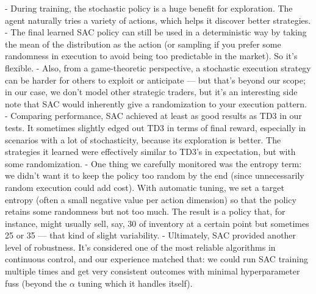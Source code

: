 \documentclass[11pt]{article}
\begin{document}
		- During training, the stochastic policy is a huge benefit for exploration. The agent naturally tries a variety of actions, which helps it discover better strategies.
		- The final learned SAC policy can still be used in a deterministic way by taking the mean of the distribution as the action (or sampling if you prefer some randomness in execution to avoid being too predictable in the market). So it’s flexible.
		- Also, from a game-theoretic perspective, a stochastic execution strategy can be harder for others to exploit or anticipate — but that’s beyond our scope; in our case, we don’t model other strategic traders, but it’s an interesting side note that SAC would inherently give a randomization to your execution pattern.
		- Comparing performance, SAC achieved at least as good results as TD3 in our tests. It sometimes slightly edged out TD3 in terms of final reward, especially in scenarios with a lot of stochasticity, because its exploration is better. The strategies it learned were effectively similar to TD3’s in expectation, but with some randomization.
		- One thing we carefully monitored was the entropy term: we didn’t want it to keep the policy too random by the end (since unnecessarily random execution could add cost). With automatic tuning, we set a target entropy (often a small negative value per action dimension) so that the policy retains some randomness but not too much. The result is a policy that, for instance, might usually sell, say, 30 of inventory at a certain point but sometimes 25 or 35 — that kind of slight variability.
		- Ultimately, SAC provided another level of robustness. It’s considered one of the most reliable algorithms in continuous control, and our experience matched that: we could run SAC training multiple times and get very consistent outcomes with minimal hyperparameter fuss (beyond the $\alpha$ tuning which it handles itself).
	
	
	
\end{document}
